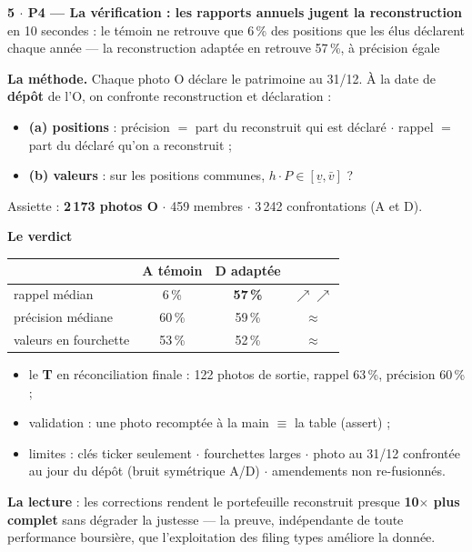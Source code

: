 \documentclass[10pt,a4paper,landscape]{article}
\begin{document}
\newpage
\begin{center}
{\Large\bfseries 5 $\cdot$ P4 --- La vérification : les rapports annuels jugent la reconstruction}\\[0.5mm]
{\scriptsize en 10 secondes : le témoin ne retrouve que 6\,\% des positions que les élus déclarent chaque année --- la reconstruction adaptée en retrouve 57\,\%, à précision égale}
\end{center}

\noindent\begin{minipage}[t]{0.42\textwidth}\vspace{0pt}
\textbf{La méthode.} Chaque photo O déclare le patrimoine au 31/12. À la date de \textbf{dépôt} de l'O, on confronte reconstruction et déclaration :
\begin{itemize}
\item[--] \textbf{(a) positions} : précision $=$ part du reconstruit qui est déclaré $\cdot$ rappel $=$ part du déclaré qu'on a reconstruit ;
\item[--] \textbf{(b) valeurs} : sur les positions communes, $h \cdot P \in [\underline v, \bar v]$ ?
\end{itemize}
Assiette : \textbf{2\,173 photos O} $\cdot$ 459 membres $\cdot$ 3\,242 confrontations (A et D).

\vspace{1.5mm}
\textbf{Le verdict}
\begin{center}\small
\begin{tabular}{@{}lccc@{}}
\toprule
 & A témoin & D adaptée & \\
\midrule
rappel médian & 6\,\% & \textbf{57\,\%} & $\nearrow\nearrow$ \\
précision médiane & 60\,\% & 59\,\% & $\approx$ \\
valeurs en fourchette & 53\,\% & 52\,\% & $\approx$ \\
\bottomrule
\end{tabular}
\end{center}
\begin{itemize}
\item[--] le \textbf{T} en réconciliation finale : 122 photos de sortie, rappel 63\,\%, précision 60\,\% ;
\item[--] validation : une photo recomptée à la main $\equiv$ la table (assert) ;
\item[--] limites : clés ticker seulement $\cdot$ fourchettes larges $\cdot$ photo au 31/12 confrontée au jour du dépôt (bruit symétrique A/D) $\cdot$ amendements non re-fusionnés.
\end{itemize}
\textbf{La lecture} : les corrections rendent le portefeuille reconstruit presque \textbf{10$\times$ plus complet}
sans dégrader la justesse --- la preuve, indépendante de toute performance boursière, que l'exploitation
des filing types améliore la donnée.
\end{minipage}\hfill
\end{document}
